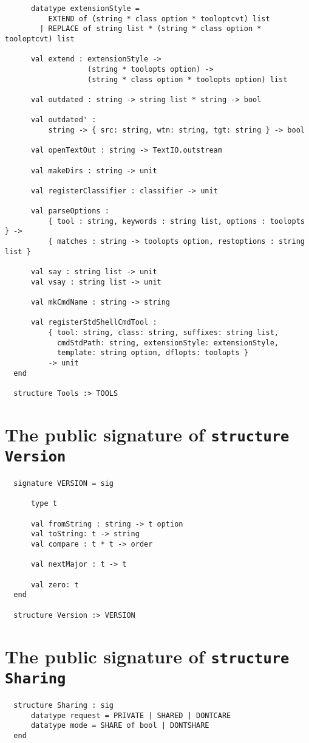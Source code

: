 \begin{lstlisting}
      datatype extensionStyle =
          EXTEND of (string * class option * tooloptcvt) list
        | REPLACE of string list * (string * class option * tooloptcvt) list

      val extend : extensionStyle ->
                   (string * toolopts option) ->
                   (string * class option * toolopts option) list

      val outdated : string -> string list * string -> bool

      val outdated' :
          string -> { src: string, wtn: string, tgt: string } -> bool

      val openTextOut : string -> TextIO.outstream

      val makeDirs : string -> unit

      val registerClassifier : classifier -> unit

      val parseOptions :
          { tool : string, keywords : string list, options : toolopts } ->
          { matches : string -> toolopts option, restoptions : string list }

      val say : string list -> unit
      val vsay : string list -> unit

      val mkCmdName : string -> string

      val registerStdShellCmdTool :
          { tool: string, class: string, suffixes: string list,
            cmdStdPath: string, extensionStyle: extensionStyle,
            template: string option, dflopts: toolopts }
          -> unit
  end

  structure Tools :> TOOLS
\end{lstlisting}%

\section{The public signature of {\tt structure Version}}

\begin{lstlisting}
  signature VERSION = sig

      type t

      val fromString : string -> t option
      val toString: t -> string
      val compare : t * t -> order

      val nextMajor : t -> t

      val zero: t
  end

  structure Version :> VERSION
\end{lstlisting}%

\section{The public signature of {\tt structure Sharing}}

\begin{lstlisting}
  structure Sharing : sig
      datatype request = PRIVATE | SHARED | DONTCARE
      datatype mode = SHARE of bool | DONTSHARE
  end
\end{lstlisting}%
